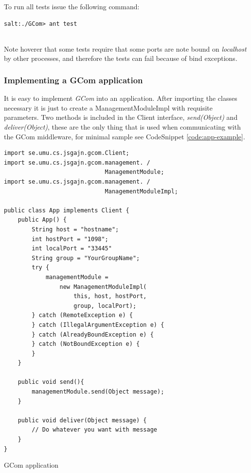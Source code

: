 \documentclass[titlepage, twocolumn, a4paper, 10pt]{article}
\begin{document}
To run all tests issue the following command:\\
\begin{footnotesize}
  \verb!salt:./GCom> ant test!
\end{footnotesize}\\
Note hoverer that some tests require that some ports are note bound on
\textit{localhost} by other processes, and therefore the tests can
fail because of bind exceptions.

\subsubsection{Implementing a GCom application}\label{sec:implgcom}
It is easy to implement \textit{GCom} into an application. After
importing the classes necessary it is just to create a
ManagementModuleImpl with requisite parameters. Two methods is
included in the Client interface, \textit{send(Object)} and
\textit{deliver(Object)}, these are the only thing that is used when
communicating with the GCom middleware, for minimal sample see
CodeSnippet \ref{code:app-example}.
\begin{code}
  \begin{footnotesize}
\begin{verbatim}
import se.umu.cs.jsgajn.gcom.Client;
import se.umu.cs.jsgajn.gcom.management. /
                             ManagementModule;
import se.umu.cs.jsgajn.gcom.management. /
                             ManagementModuleImpl;

public class App implements Client {
    public App() {
        String host = "hostname";
        int hostPort = "1098";
        int localPort = "33445"
        String group = "YourGroupName";
        try {
            managementModule =
                new ManagementModuleImpl(
                    this, host, hostPort,
                    group, localPort);
        } catch (RemoteException e) {
        } catch (IllegalArgumentException e) {
        } catch (AlreadyBoundException e) {
        } catch (NotBoundException e) {
        }
    }

    public void send(){
        managementModule.send(Object message);
    }

    public void deliver(Object message) {
        // Do whatever you want with message
    }
}
\end{verbatim}
  \end{footnotesize}
  \caption{GCom application}
  \label{code:app-example}
\end{code}
\newpage %
\end{document}
